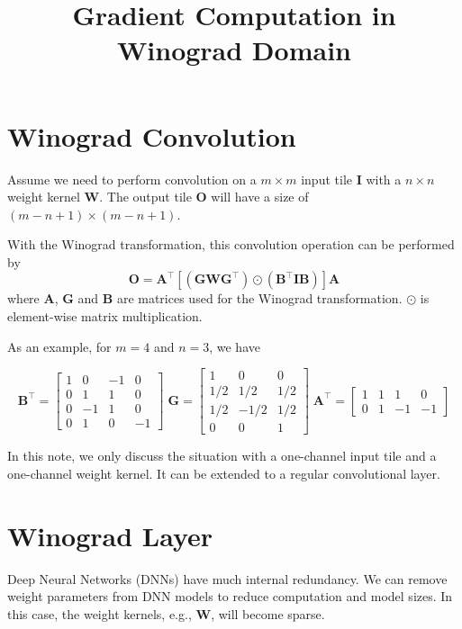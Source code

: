 \documentclass[12pt]{article} %
\title{Gradient Computation in Winograd Domain}
\date{\vspace{-5ex}}
\begin{document}
\maketitle

\section{Winograd Convolution}
Assume we need to perform convolution on a $m \times m$ input tile $\boldsymbol{I}$ with a $n \times n$ weight kernel $\boldsymbol{W}$. The output tile $\boldsymbol{O}$ will have a size of $(m - n + 1) \times (m - n + 1)$.

With the Winograd transformation, this convolution operation can be performed by
\begin{equation}
	\boldsymbol{O} = \boldsymbol{A}^{\top} \left [ (\boldsymbol{G} \boldsymbol{W} \boldsymbol{G}^{\top}) \odot (\boldsymbol{B}^{\top} \boldsymbol{I} \boldsymbol{B}) \right ] \boldsymbol{A}
\end{equation}
where $\boldsymbol{A}$, $\boldsymbol{G}$ and $\boldsymbol{B}$ are matrices used for the Winograd transformation. $\odot$ is element-wise matrix multiplication.

As an example, for $m = 4$ and $n = 3$, we have

\begin{equation}
\boldsymbol{B}^{\top}=\left [ \begin{matrix}
 1 & 0 & -1 & 0 \\ 
 0 & 1 & 1 & 0 \\ 
 0 & -1 & 1 & 0 \\ 
 0 & 1 & 0 & -1
\end{matrix} \right ]
\;
\boldsymbol{G}=\left [ \begin{matrix}
 1 & 0 & 0\\ 
 1/2 & 1/2 & 1/2 \\ 
 1/2 & -1/2 & 1/2 \\ 
 0 & 0 & 1 
\end{matrix} \right ]
\;
\boldsymbol{A}^{\top}=\left [ \begin{matrix}
 1 & 1 & 1 & 0 \\ 
 0 & 1 & -1 & -1
\end{matrix} \right ]
\end{equation}

In this note, we only discuss the situation with a one-channel input tile and a one-channel weight kernel. It can be extended to a regular convolutional layer.

\section{Winograd Layer}
Deep Neural Networks (DNNs) have much internal redundancy. We can remove weight parameters from DNN models to reduce computation and model sizes. In this case, the weight kernels, e.g., $\boldsymbol{W}$, will become sparse.
\end{document}
